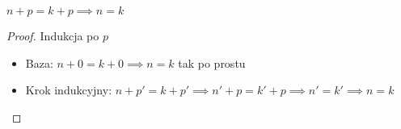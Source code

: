 \begin{theorem}
    \( n + p = k + p \implies n = k \)
\end{theorem}
\begin{proof}
    Indukcja po \( p \)
    \begin{itemize}
        \item Baza: \( n + 0 = k + 0 \implies n = k \) tak po prostu
        \item Krok indukcyjny: \( n + p' = k + p' \implies n' + p = k' + p \implies n' = k' \implies n = k \)
    \end{itemize}
\end{proof}